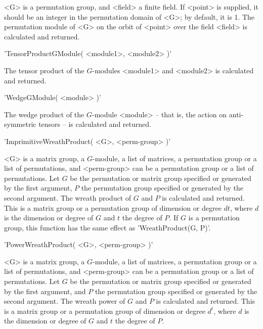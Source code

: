 <G> is  a permutation group, and <field>  a finite  field.  If <point> is
supplied, it  should be an  integer in the  permutation domain of <G>; by
default, it is 1. The  permutation module of <G> on  the orbit of <point>
over the field <field> is calculated and returned.


%

'TensorProductGModule( <module1>, <module2> )'

The  tensor  product  of  the  $G$-modules   <module1> and   <module2> is
calculated and returned.

'WedgeGModule( <module> )'

The wedge  product of the  $G$-module <module> -- that  is, the action on
anti-symmetric tensors -- is calculated and returned.



'ImprimitiveWreathProduct( <G>, <perm-group> )'

<G> is a matrix  group, a $G$-module, a  list of matrices,  a permutation
group  or a list of permutations,  and <perm-group> can  be a permutation
group  or a list of permutations.   Let $G$ be  the permutation or matrix
group specified  or generated by  the first argument, $P$ the permutation
group specified or generated by the  second argument.  The wreath product
of $G$  and $P$ is  calculated and returned. This is  a matrix group or a
permutation group of dimension or degree $dt$, where $d$ is the dimension
or  degree of $G$  and $t$ the degree of  $P$.  If  $G$ is a permutation
group, this function has the same effect as 'WreathProduct(G, P)'.



'PowerWreathProduct( <G>, <perm-group> )'

<G>  is a matrix group,  a $G$-module, a list  of matrices, a permutation
group or a  list of permutations, and  <perm-group> can  be a permutation
group or  a list of permutations.  Let  $G$ be  the permutation or matrix
group specified or   generated   by the  first  argument,  and   $P$  the
permutation  group specified  or generated  by  the second argument.  The
wreath power of $G$ and $P$ is calculated and returned.  This is a matrix
group or a permutation  group of dimension or degree  $d^t$, where $d$ is
the dimension or degree of $G$ and $t$ the degree of $P$.

